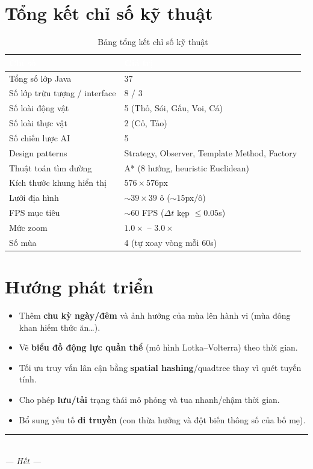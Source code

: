 \documentclass[12pt,a4paper]{report}
\newcommand{\keyword}[1]{\textcolor{primaryblue}{\textbf{#1}}}
\begin{document}
\section{Tổng kết chỉ số kỹ thuật}

\begin{table}[H]
\centering
\caption{Bảng tổng kết chỉ số kỹ thuật}
\begin{tabular}{L{6cm} L{6cm}}
\toprule
{}
\textcolor{white}{\textbf{Chỉ số}} & \textcolor{white}{\textbf{Giá trị}} \\
\midrule
Tổng số lớp Java & 37 \\
 Số lớp trừu tượng / interface & 8 / 3 \\
Số loài động vật & 5 (Thỏ, Sói, Gấu, Voi, Cá) \\
 Số loài thực vật & 2 (Cỏ, Tảo) \\
Số chiến lược AI & 5 \\
 Design patterns & Strategy, Observer, Template Method, Factory \\
Thuật toán tìm đường & A* (8 hướng, heuristic Euclidean) \\
 Kích thước khung hiển thị & $576\times576$px \\
Lưới địa hình & $\sim39\times39$ ô ($\sim15$px/ô) \\
 FPS mục tiêu & $\sim60$ FPS ($\Delta t$ kẹp $\leq0.05$s) \\
Mức zoom & $1.0\times$ -- $3.0\times$ \\
 Số mùa & 4 (tự xoay vòng mỗi 60s) \\
\bottomrule
\end{tabular}
\end{table}

\section{Hướng phát triển}

\begin{itemize}[leftmargin=1.5em]
    \item Thêm \keyword{chu kỳ ngày/đêm} và ảnh hưởng của mùa lên hành vi (mùa đông khan hiếm thức ăn\dots).
    \item Vẽ \keyword{biểu đồ động lực quần thể} (mô hình Lotka--Volterra) theo thời gian.
    \item Tối ưu truy vấn lân cận bằng \keyword{spatial hashing}/quadtree thay vì quét tuyến tính.
    \item Cho phép \keyword{lưu/tải} trạng thái mô phỏng và tua nhanh/chậm thời gian.
    \item Bổ sung yếu tố \keyword{di truyền} (con thừa hưởng và đột biến thông số của bố mẹ).
\end{itemize}

\vspace{1cm}
\begin{center}
\rule{0.5\textwidth}{0.5pt}\\[0.5em]
\textit{--- Hết ---}
\end{center}
\end{document}
